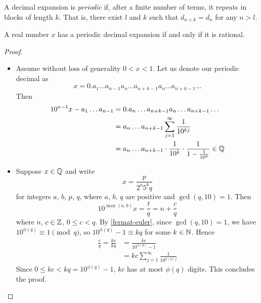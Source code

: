 \documentclass{../template/note}
\begin{document}

    \begin{definition}
        A decimal expansion is \emph{periodic} if, after a finite number of terms, it repeats in blocks of length \(k\). That is, there exist \(l\) and \(k\) such that \(d_{n+k} = d_n\) for any \(n > l\).
    \end{definition}
    
    \begin{proposition}
        A real number \(x\) has a periodic decimal expansion if and only if it is rational.
    \end{proposition}
    
    \begin{proof}
        \begin{itemize}
            \item[\(\implies\)]
            Assume without loss of generality \(0 < x < 1\). Let us denote our periodic decimal as
            \[
                x = 0.a_1\dots a_{n-1} a_n \dots a_{n+k-1} a_n \dots a_{n+k-1} \dots 
            \]
            Then
            \begin{align*}
                10^{n-1}x - a_1\dots a_{n-1} &= 0.a_n \dots a_{n+k-1} a_n \dots a_{n+k-1} \dots  \\
                &= a_n \dots a_{n+k-1} \sum_{j=1}^\infty \frac{1}{10^{kj}} \\
                &= a_n \dots a_{n+k-1} \cdot \frac{1}{10^k} \cdot \frac{1}{1-\frac{1}{10^k}} \in \mathbb Q
            \end{align*}
            \item[\(\impliedby\)] Suppose \(x \in \mathbb Q\) and write
            \[
                x = \frac{p}{2^a5^bq}
            \]
            for integers \(a\), \(b\), \(p\), \(q\), where \(a\), \(b\), \(q\) are positive and \(\gcd(q, 10) = 1\). Then
            \[
                10^{\max(a,b)}x = \frac{t}{q} = n + \frac{c}{q}
            \]
            where \(n\), \(c \in \mathbb Z\), \(0 \leq c < q\). By \cref{fermat-euler}, since \(\gcd(q, 10) = 1\), we have \(10^{\phi(q)} \equiv 1 \pmod q\), so \(10^{\phi(q)} - 1 \equiv kq\) for some \(k \in \mathbb N\). Hence
            \begin{align*}
                \frac{c}{q} = \frac{kc}{kq} &= \frac{kc}{10^{\phi(q)}-1} \\
                &= kc \sum_{j=1}^\infty \frac{1}{10^{\phi(q)j}}
            \end{align*}
            Since \(0 \leq kc < kq = 10^{\phi(q)} - 1\), \(kc\) has at most \(\phi(q)\) digits. This concludes the proof.
        \end{itemize}
    \end{proof}
    
\end{document}
